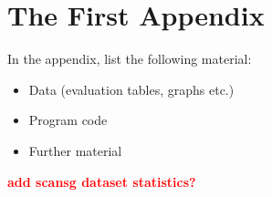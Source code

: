 %
\chapter{The First Appendix}

In the appendix, list the following material: 

\begin{itemize}
 \item Data (evaluation tables, graphs etc.)
 \item Program code
 \item Further material 
\end{itemize}


\textcolor{red}{\textbf{add scansg dataset statistics?}}